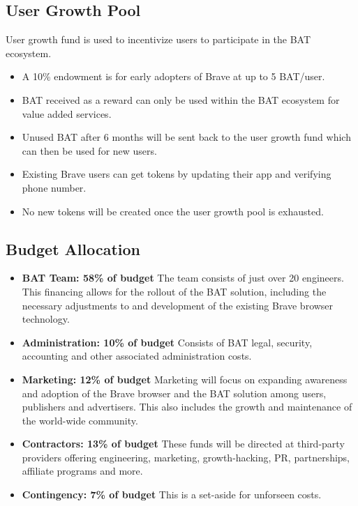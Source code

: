 \documentclass[11pt]{article}
\begin{document}
\subsection{User Growth Pool}
\label{sec-6-3}
User growth fund is used to incentivize users to participate in the \textrm{BAT} ecosystem.
\begin{itemize}
\item{A 10\% endowment is for early adopters of Brave at up to 5 \textrm{BAT}/user.}
\item{\textrm{BAT} received as a reward can only be used within the \textrm{BAT} ecosystem for value added services.}
\item{Unused \textrm{BAT} after 6 months will be sent back to the user growth fund which can then be used for new users.}
\item{Existing Brave users can get tokens by updating their app and verifying phone number.}
\item{No new tokens will be created once the user growth pool is exhausted.}
\end{itemize}

\subsection{Budget Allocation}
\label{sec-6-4}
\begin{itemize}
\item{\textbf{BAT Team: 58\% of budget} The team consists of just over 20 engineers. This financing allows for the rollout of the \textrm{BAT} solution, including the necessary adjustments to and development of the existing Brave browser technology.  }
\item{\textbf{Administration: 10\% of budget} Consists of \textrm{BAT} legal, security, accounting and other associated administration costs. }
\item{\textbf{Marketing: 12\% of budget} Marketing will focus on expanding awareness and adoption of the Brave browser and the \textrm{BAT} solution among users, publishers and advertisers. This also includes the growth and maintenance of the world-wide community.}
\item{\textbf{Contractors: 13\% of budget} These funds will be directed at third-party providers offering engineering, marketing, growth-hacking, PR, partnerships, affiliate programs and more. }
\item{\textbf{Contingency: 7\% of budget} This is a set-aside for unforseen costs. }
\end{itemize}
\end{document}
